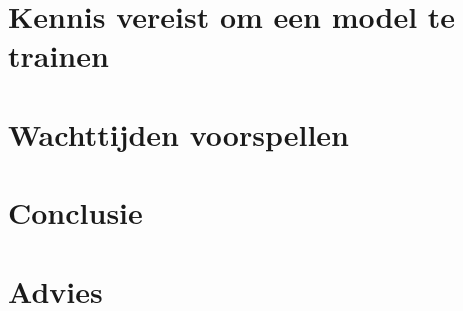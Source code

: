 \section{Kennis vereist om een model te trainen}\label{sec:kennis-vereist-om-een-model-te-trainen}


\section{Wachttijden voorspellen}\label{sec:wachttijden-voorspellen}


\section{Conclusie}\label{sec:conclusie}


\section{Advies}\label{sec:advies}
